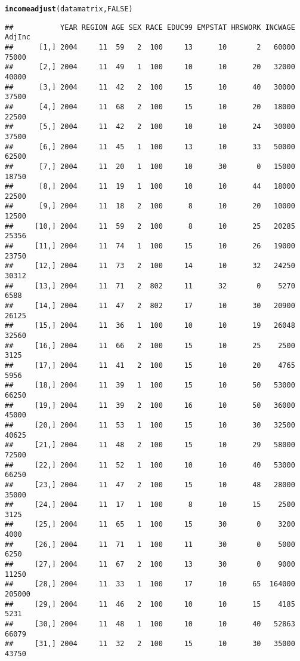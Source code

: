 \documentclass{article}\usepackage[]{graphicx}\usepackage[]{color}
\makeatletter
\newcommand{\hlnum}[1]{\textcolor[rgb]{0.686,0.059,0.569}{#1}}%
\newcommand{\hlstd}[1]{\textcolor[rgb]{0.345,0.345,0.345}{#1}}%
\newcommand{\hlkwd}[1]{\textcolor[rgb]{0.737,0.353,0.396}{\textbf{#1}}}%
\newenvironment{kframe}{%
 \def\at@end@of@kframe{}%
 \ifinner\ifhmode%
  \def\at@end@of@kframe{\end{minipage}}%
  \begin{minipage}{\columnwidth}%
 \fi\fi%
 \def\FrameCommand##1{\hskip\@totalleftmargin \hskip-\fboxsep
 \colorbox{shadecolor}{##1}\hskip-\fboxsep
     \hskip-\linewidth \hskip-\@totalleftmargin \hskip\columnwidth}%
 \MakeFramed {\advance\hsize-\width
   \@totalleftmargin\z@ \linewidth\hsize
   \@setminipage}}%
 {\par\unskip\endMakeFramed%
 \at@end@of@kframe}
\newenvironment{knitrout}{}{} %
\makeatother
\begin{document}
\begin{knitrout}
\begin{kframe}
\begin{alltt}
\hlkwd{incomeadjust}\hlstd{(datamatrix,} \hlnum{FALSE}\hlstd{)}
\end{alltt}
\begin{verbatim}
##           YEAR REGION AGE SEX RACE EDUC99 EMPSTAT HRSWORK INCWAGE  AdjInc
##      [1,] 2004     11  59   2  100     13      10       2   60000   75000
##      [2,] 2004     11  49   1  100     10      10      20   32000   40000
##      [3,] 2004     11  42   2  100     15      10      40   30000   37500
##      [4,] 2004     11  68   2  100     15      10      20   18000   22500
##      [5,] 2004     11  42   2  100     10      10      24   30000   37500
##      [6,] 2004     11  45   1  100     13      10      33   50000   62500
##      [7,] 2004     11  20   1  100     10      30       0   15000   18750
##      [8,] 2004     11  19   1  100     10      10      44   18000   22500
##      [9,] 2004     11  18   2  100      8      10      20   10000   12500
##     [10,] 2004     11  59   2  100      8      10      25   20285   25356
##     [11,] 2004     11  74   1  100     15      10      26   19000   23750
##     [12,] 2004     11  73   2  100     14      10      32   24250   30312
##     [13,] 2004     11  71   2  802     11      32       0    5270    6588
##     [14,] 2004     11  47   2  802     17      10      30   20900   26125
##     [15,] 2004     11  36   1  100     10      10      19   26048   32560
##     [16,] 2004     11  66   2  100     15      10      25    2500    3125
##     [17,] 2004     11  41   2  100     15      10      20    4765    5956
##     [18,] 2004     11  39   1  100     15      10      50   53000   66250
##     [19,] 2004     11  39   2  100     16      10      50   36000   45000
##     [20,] 2004     11  53   1  100     15      10      30   32500   40625
##     [21,] 2004     11  48   2  100     15      10      29   58000   72500
##     [22,] 2004     11  52   1  100     10      10      40   53000   66250
##     [23,] 2004     11  47   2  100     15      10      48   28000   35000
##     [24,] 2004     11  17   1  100      8      10      15    2500    3125
##     [25,] 2004     11  65   1  100     15      30       0    3200    4000
##     [26,] 2004     11  71   1  100     11      30       0    5000    6250
##     [27,] 2004     11  67   2  100     13      30       0    9000   11250
##     [28,] 2004     11  33   1  100     17      10      65  164000  205000
##     [29,] 2004     11  46   2  100     10      10      15    4185    5231
##     [30,] 2004     11  48   1  100     10      10      40   52863   66079
##     [31,] 2004     11  32   2  100     15      10      30   35000   43750

\end{verbatim}
\end{kframe}
\end{knitrout}
\end{document}
